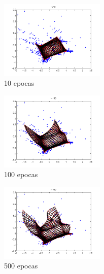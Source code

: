 \documentclass[informe.tex]{subfiles}
\begin{document}
	\begin{minipage}{0.33\textwidth}
	  \centering
	  \begin{figure}[H]
	    \centering
	    \includegraphics[height=3.75cm,keepaspectratio]{graficos/tiempo/10.png}
		  \caption{\small 10 epocas}
	  \end{figure}
	  
	  \begin{figure}[H]
	    \centering
	    \includegraphics[height=3.75cm,keepaspectratio]{graficos/tiempo/100.png}
		  \caption{\small 100 epocas}
	  \end{figure}
	  
	  \begin{figure}[H]
	    \centering
	    \includegraphics[height=3.75cm,keepaspectratio]{graficos/tiempo/500.png}
		  \caption{\small 500 epocas}
	  \end{figure}
	\end{minipage}
\end{document}
